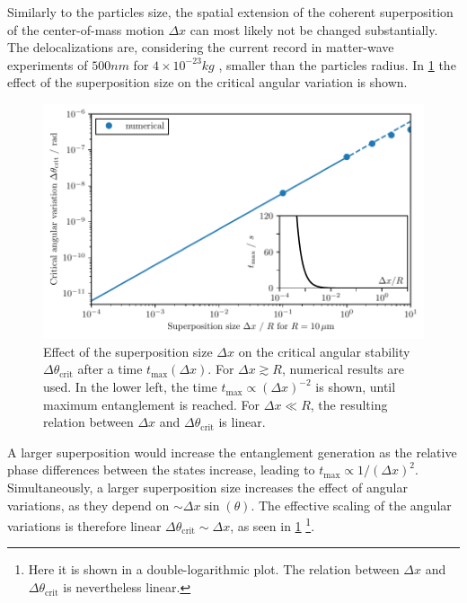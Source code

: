 Similarly to the particles size, the spatial extension of the coherent superposition of the center-of-mass motion $\Delta x$ can most likely not be changed substantially. The delocalizations are, considering the current record in matter-wave experiments of $500\si{nm}$ for $4\times 10^{-23}\si{kg}$ \cite{Fein_2019}, smaller than the particles radius. 
In \cref{fig:4:theta-crit-superposition-size} the effect of the superposition size on the critical angular variation is shown.
\begin{figure}[!htbp]
  \centering
  \includegraphics[width=\textwidth]{./../figures/theta-variance/theta-crit-superpos-size.pdf}
  \caption{Effect of the superposition size $\Delta x$ on the critical angular stability $\Delta \theta_\mathrm{crit}$ after a time $t_\mathrm{max}(\Delta x)$. For $\Delta x \gtrsim R$, numerical results are used. In the lower left, the time $t_\mathrm{max} \propto (\Delta x)^{-2}$ is shown, until maximum entanglement is reached. For $\Delta x \ll R$, the resulting relation between $\Delta x$ and $\Delta \theta_\mathrm{crit}$ is linear.}
  \label{fig:4:theta-crit-superposition-size}
\end{figure}
A larger superposition would increase the entanglement generation as the relative phase differences between the states increase, leading to $t_\mathrm{max} \propto 1/(\Delta x)^{2}$. 
Simultaneously, a larger superposition size increases the effect of angular variations, as they depend on $\sim \Delta x \sin(\theta)$.
The effective scaling of the angular variations is therefore linear $\Delta \theta_\mathrm{crit} \sim \Delta x$, as seen in \cref{fig:4:theta-crit-superposition-size} \footnote{Here it is shown in a double-logarithmic plot. The relation between $\Delta x$ and $\Delta \theta_\mathrm{crit}$ is nevertheless linear.}.



